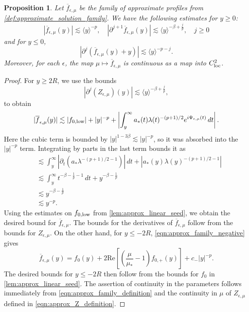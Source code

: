 \documentclass[11pt]{amsart}
\newtheorem{proposition}[theorem]{Proposition}
\theoremstyle{definition}
\theoremstyle{remark}
\numberwithin{equation}{section}
\newcommand{\ov}[1]{\overline{#1}}
\newcommand{\ang}[1]{\langle #1 \rangle}
\begin{document}
\begin{proposition}\label{prop:approx_profile_bounds}
    Let $\ov{f}_{\epsilon, \mu}$ be the family of approximate profiles from \cref{def:approximate_solution_family}. We have the following estimates for $y \geq 0$:
        \[|\ov{f}_{\epsilon, \mu}(y)| \lesssim \ang{y}^{-p}, \quad |\partial^{j+1}\ov{f}_{\epsilon, \mu}(y)| \lesssim \ang{y}^{-\beta + \frac{j}{p}}, \quad j \geq 0\]
        and for $y \leq 0$,
        \[|\partial^{j}(\ov{f}_{\epsilon, \mu}(y) + y)| \lesssim \ang{y}^{-p - j}.\]
    Moreover, for each $\epsilon$, the map $\mu \mapsto \ov{f}_{\epsilon, \mu}$ is continuous as a map into $C_{\textup{loc}}^2$.
\end{proposition}

\begin{proof}
    For $y \geq 2R$, we use the bounds
    \[|\partial^{j}(Z_{\epsilon, \mu})(y)| \lesssim \ang{y}^{-\beta + \frac{j}{p}},\]
    to obtain 
    \begin{align*}
        |\ov{f}_{\epsilon,\mu}(y)| \lesssim |f_{0, \textup{low}}| + |y|^{-p} + \left|\int_{y}^{\infty}a_*(t) \lambda(t)^{-(p+1)/2}e^{i\Psi_{\epsilon,\mu}(t)}\, dt\right|.
    \end{align*}
    Here the cubic term is bounded by $|y|^{1-3\beta} \lesssim |y|^{-p}$, so it was absorbed into the $|y|^{-p}$ term. Integrating by parts in the last term bounds it as 
    \begin{align*}
        &\lesssim \int_{y}^{\infty}|\partial_t(a_* \lambda^{-(p+1)/2 - 1})| \, dt + |a_*(y)\lambda(y)^{-(p+1)/2 - 1}|\\
        &\lesssim \int_y^\infty t^{-\beta-\frac1p-1}\,dt+y^{-\beta-\frac1p}\\
        &\lesssim y^{-\beta-\frac1p} \\
        & \lesssim y^{-p}.
    \end{align*}
    Using the estimates on $f_{0,\textup{low}}$ from \cref{lem:approx_linear_seed}, we obtain the desired bound for $\ov{f}_{\epsilon, \mu}$. The bounds for the derivatives of $\ov{f}_{\epsilon, \mu}$ follow from the bounds for $Z_{\epsilon,\mu}$. On the other hand, for $y \leq -2R$, \eqref{eqn:approx_family_negative} gives 
    \[\ov{f}_{\epsilon,\mu}(y) = f_0(y) + 2\text{Re}\left[\left(\frac{\mu}{\mu_*} - 1\right)f_{0,+}(y)\right] + c_- |y|^{-p}.\]
    The desired bounds for $y \leq -2R$ then follow from the bounds for $f_0$ in \cref{lem:approx_linear_seed}. The assertion of continuity in the parameters follows immediately from \eqref{eqn:approx_family_definition} and the continuity in $\mu$ of $Z_{\epsilon, \mu}$ defined in \eqref{eqn:approx_Z_definition}.
\end{proof}
\end{document}
